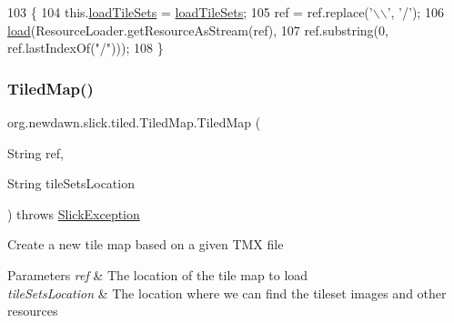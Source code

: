 \begin{DoxyCode}
103                                                                             \{
104         this.\mbox{\hyperlink{classorg_1_1newdawn_1_1slick_1_1tiled_1_1_tiled_map_a49356f102a76e7845f6dfbd4c6b70b59}{loadTileSets}} = \mbox{\hyperlink{classorg_1_1newdawn_1_1slick_1_1tiled_1_1_tiled_map_a49356f102a76e7845f6dfbd4c6b70b59}{loadTileSets}};
105         ref = ref.replace(\textcolor{charliteral}{'\(\backslash\)\(\backslash\)'}, \textcolor{charliteral}{'/'});
106         \mbox{\hyperlink{classorg_1_1newdawn_1_1slick_1_1tiled_1_1_tiled_map_af1c08899abc9e8c33cb08704b764e498}{load}}(ResourceLoader.getResourceAsStream(ref),
107                 ref.substring(0, ref.lastIndexOf(\textcolor{stringliteral}{"/"})));
108     \}
\end{DoxyCode}
\mbox{\label{classorg_1_1newdawn_1_1slick_1_1tiled_1_1_tiled_map_a33061cc036aa416441dff631f1fc2c75}} 
\subsubsection{\texorpdfstring{Tiled\+Map()}{TiledMap()}\hspace{0.1cm}{\footnotesize\ttfamily [3/5]}}
{\footnotesize\ttfamily org.\+newdawn.\+slick.\+tiled.\+Tiled\+Map.\+Tiled\+Map (\begin{DoxyParamCaption}\item[{String}]{ref,  }\item[{String}]{tile\+Sets\+Location }\end{DoxyParamCaption}) throws \mbox{\hyperlink{classorg_1_1newdawn_1_1slick_1_1_slick_exception}{Slick\+Exception}}\hspace{0.3cm}{\ttfamily [inline]}}

Create a new tile map based on a given T\+MX file


\begin{DoxyParams}{Parameters}
{\em ref} & The location of the tile map to load \\
\hline
{\em tile\+Sets\+Location} & The location where we can find the tileset images and other resources \\
\hline
\end{DoxyParams}

